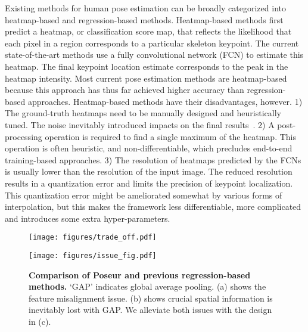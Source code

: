 \documentclass[runningheads]{llncs}
\def\handle{{Poseur}\xspace}
\begin{document}
Existing methods for human pose estimation can be broadly categorized into heatmap-based and regression-based methods.
Heatmap-based methods first predict a heatmap, or classification score map, that reflects the likelihood that each pixel in a region corresponds to a particular skeleton keypoint. The current state-of-the-art methods use a fully convolutional network (FCN) to estimate this heatmap. The final keypoint location estimate corresponds to the peak in the heatmap intensity. Most current pose estimation methods are heatmap-based because this approach has thus far achieved higher accuracy than regression-based approaches. Heatmap-based methods have their disadvantages, however. 
1) The ground-truth heatmaps need to be manually designed and heuristically tuned.  The noise inevitably introduced impacts on the final results~\cite{luo2020rethinking,sun2017compositional,huang2020devil}. 
2)  A post-processing operation is required to find a single maximum of the heatmap. This operation is often
heuristic, and non-differentiable, which precludes end-to-end training-based approaches. 3) The resolution of heatmaps predicted by the FCNs is usually lower than the resolution of the input image. The reduced resolution results in a quantization error and limits the precision of keypoint localization. This quantization error might be ameliorated somewhat by various forms of interpolation, but this makes the framework less differentiable, more complicated and introduces some extra hyper-parameters.







\begin{figure}
	\centering
	\begin{minipage}[t]{0.45\linewidth}
		\centering
		\texttt{[image: figures/trade\_off.pdf]}
		\caption{
        \textbf{Comparing the proposed \handle against heatmap-based methods} with various backbone networks on COCO \emph{val.}\ set. Baseline refers to heatmap-based methods. Heatmap-based baseline of MobileNet-V2 and ResNet use the same deconvolutional head as SimpleBaseline~\cite{xiao2018simple}.
        }
        \label{fig:trade_off}
	\end{minipage}
	\hspace{.2em}
	\begin{minipage}[t]{0.45\linewidth}
		\centering
		\texttt{[image: figures/issue\_fig.pdf]}
		\caption{
        \textbf{Comparison of \handle and previous regression-based methods.}  `GAP' indicates global average pooling. (a) shows the feature misalignment issue. (b) shows crucial spatial information is inevitably lost with GAP. We alleviate both issues with the design in (c). \;\;\;\;\;\;
        }
        \label{fig:difference}
	\end{minipage}
\end{figure}
\end{document}
